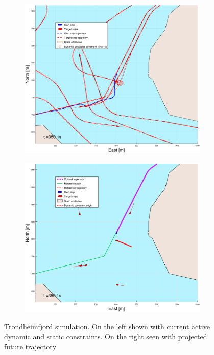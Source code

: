 \begin{figure}[ht]
\begin{subfigure}[b]{0.499\textwidth}
    \end{subfigure}
    \hfill
    \\
    \begin{subfigure}[b]{0.49\textwidth}
        \centering
        \includegraphics[width=\textwidth]{Images/Figures/Trheimfjord/_Simple_0fig1_time=350}
    \end{subfigure}
    \hfill
    \begin{subfigure}[b]{0.499\textwidth}
        \centering
        \includegraphics[width=\textwidth]{Images/Figures/Trheimfjord/_Simple_0fig999_time=350}
    \end{subfigure}
    \hfill
    \caption{Trondheimfjord simulation. On the left shown with current active dynamic and static constraints. On the right seen with projected future trajectory}
\end{figure}


